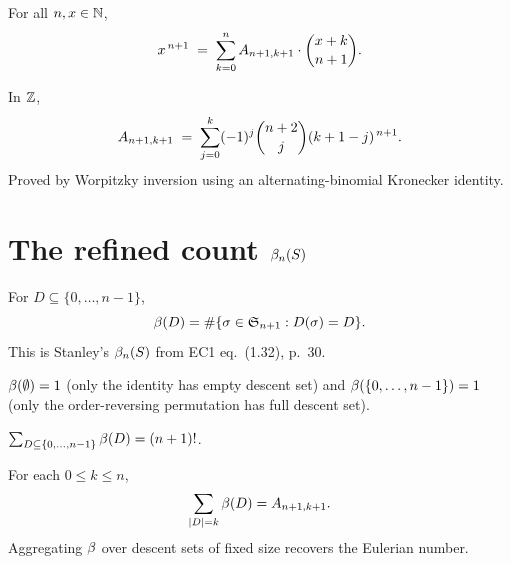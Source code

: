 \begin{theorem}
  \label{thm:worpitzky}
  \rocqok
  For all $n, x \in \mathbb{N}$,
  \[
    x^{\,n+1}
    \;=\;
    \sum_{k=0}^{n} A_{n+1,k+1} \cdot \binom{x+k}{n+1}.
  \]
\end{theorem}

\begin{theorem}
  \label{thm:eulerian_explicit}
  \rocqok
  In $\mathbb{Z}$,
  \[
    A_{n+1,k+1}
    \;=\;
    \sum_{j=0}^{k} (-1)^{j} \binom{n+2}{j} (k+1-j)^{\,n+1}.
  \]
  Proved by Worpitzky inversion using an alternating-binomial
  Kronecker identity.
\end{theorem}

\section{The refined count $\beta_n(S)$}

\begin{definition}
  \label{def:beta}
  \rocqok
  For $D \subseteq \{0, \dots, n-1\}$,
  \[
    \beta(D) = \#\{\sigma \in \mathfrak{S}_{n+1} : D(\sigma) = D\}.
  \]
  This is Stanley's $\beta_n(S)$ from EC1 eq.~(1.32), p.~30.
\end{definition}

\begin{lemma}
  \label{lem:beta_boundary}
  \rocqok
  $\beta(\emptyset) = 1$ (only the identity has empty descent set) and
  $\beta(\{0, \dots, n-1\}) = 1$ (only the order-reversing permutation
  has full descent set).
\end{lemma}

\begin{theorem}
  \label{thm:sum_beta_eq_fact}
  \rocqok
  $\sum_{D \subseteq \{0, \dots, n-1\}} \beta(D) = (n+1)!$.
\end{theorem}

\begin{theorem}
  \label{thm:beta_eulerian}
  \rocqok
  For each $0 \leq k \leq n$,
  \[
    \sum_{|D| = k} \beta(D) = A_{n+1,k+1}.
  \]
  Aggregating $\beta$ over descent sets of fixed size recovers the
  Eulerian number.
\end{theorem}

